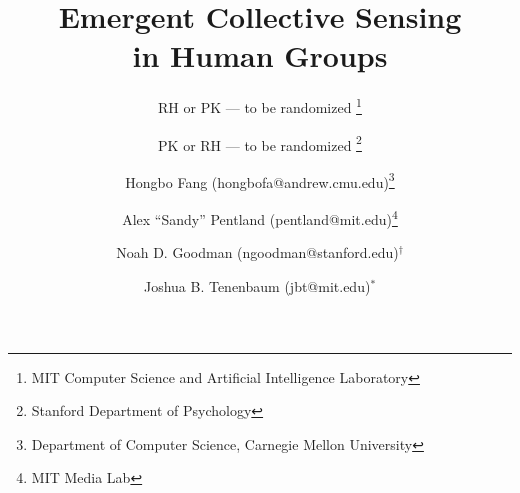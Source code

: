 \documentclass[12pt,letterpaper]{article}
\title{Emergent Collective Sensing \\in Human Groups}
\author{
RH or PK --- to be randomized \thanks{MIT Computer Science and Artificial Intelligence Laboratory}
\vspace{-.5em}
\and 
PK or RH --- to be randomized \thanks{Stanford Department of Psychology}
\vspace{-.5em}
\and 
Hongbo Fang (hongbofa@andrew.cmu.edu)\thanks{Department of Computer Science, Carnegie Mellon University}
\vspace{-.5em}
\and
Alex ``Sandy'' Pentland (pentland@mit.edu)\thanks{MIT Media Lab}
\and 
Noah D. Goodman (ngoodman@stanford.edu)$^\dagger$
\and 
Joshua B. Tenenbaum (jbt@mit.edu)$^*$
}
\date{}
\begin{document}
\maketitle
\vspace{-2em}

\begin{abstract}














\end{abstract}
\end{document}
